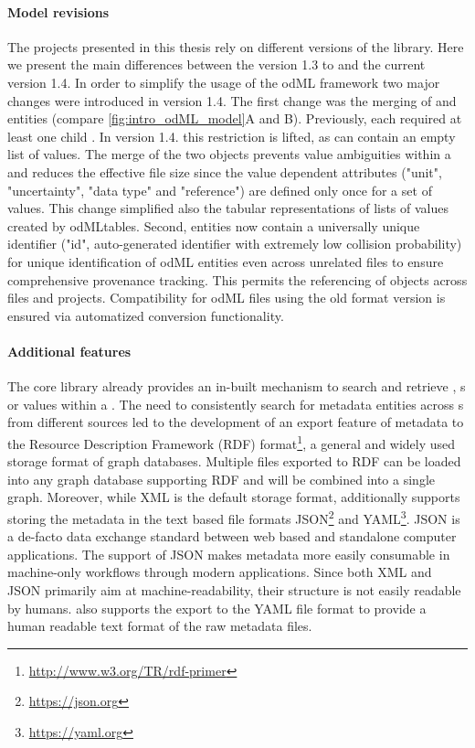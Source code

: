 \paragraph{Model revisions}
\label{sec:odml_model_revision}
The projects presented in this thesis rely on different versions of the  library. Here we present the main differences between the  version 1.3 to and the current  version 1.4.
In order to simplify the usage of the odML framework two major changes were introduced in  version 1.4. The first change was the merging of  and  entities (compare \ref{fig:intro_odML_model}A and B). Previously, each  required at least one child . In version 1.4. this restriction is lifted, as  can contain an empty list of values. The merge of the two objects prevents value ambiguities within a  and reduces the effective file size since the value dependent attributes ("unit", "uncertainty", "data type" and "reference") are defined only once for a set of values. This change simplified also the tabular representations of lists of values created by odMLtables. Second, entities now contain a universally unique identifier ("id", auto-generated identifier with extremely low collision probability) for unique identification of odML entities even across unrelated files to ensure comprehensive provenance tracking. This permits the referencing of  objects across files and projects. Compatibility for odML files using the old format version is ensured via automatized conversion functionality.

\paragraph{Additional features}
The  core library already provides an in-built mechanism to search and retrieve , s or values within a . The need to consistently search for metadata entities across s from different sources led to the development of an export feature of  metadata to the Resource Description Framework (RDF) format\footnote{\url{http://www.w3.org/TR/rdf-primer}}, a general and widely used storage format of graph databases. Multiple  files exported to RDF can be loaded into any graph database supporting RDF and will be combined into a single graph. Moreover, while XML is the default storage format,  additionally supports storing the metadata in the text based file formats JSON\footnote{\url{https://json.org}} and YAML\footnote{\url{https://yaml.org}}. JSON is a de-facto data exchange standard between web based and standalone computer applications. The support of JSON makes  metadata more easily consumable in machine-only workflows through modern applications. Since both XML and JSON primarily aim at machine-readability, their structure is not easily readable by humans.  also supports the export to the YAML file format to provide a human readable text format of the raw metadata files.

